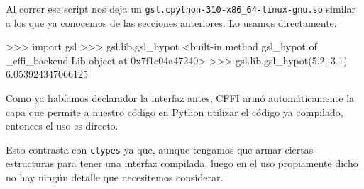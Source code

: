 Al correr ese script nos deja un \texttt{gsl.cpython-310-x86\_64-linux-gnu.so} similar a los que ya conocemos de las secciones anteriores. Lo usamos directamente:

\begin{py}
>>> import gsl
>>> gsl.lib.gsl_hypot
<built-in method gsl_hypot of _cffi_backend.Lib object at 0x7f1c04a47240>
>>> gsl.lib.gsl_hypot(5.2, 3.1)
6.053924347066125
\end{py}

Como ya habíamos declarador la interfaz antes, CFFI armó automáticamente la capa que permite a nuestro código en Python utilizar el código ya compilado, entonces el uso es directo. 

Esto contrasta con \texttt{ctypes} ya que, aunque tengamos que armar ciertas estructuras para tener una interfaz compilada, luego en el uso propiamente dicho no hay ningún detalle que necesitemos considerar.
